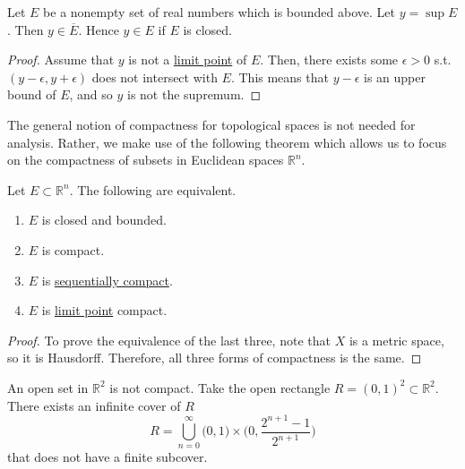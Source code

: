   \begin{theorem}
    \label{thm:the-supremum-is-a-closure-point}
    Let $E$ be a nonempty set of real numbers which is bounded above. Let $y = \sup{E}$. Then $y \in \overline{E}$. Hence $y \in E$ if $E$ is closed. 
  \end{theorem}
  \begin{proof}
    Assume that $y$ is not a \hyperref[pst-def:limit-point]{limit point} of $E$. Then, there exists some $\epsilon > 0$ s.t. $(y - \epsilon, y + \epsilon)$ does not intersect with $E$. This means that $y - \epsilon$ is an upper bound of $E$, and so $y$ is not the supremum. 
  \end{proof}

  The general notion of compactness for topological spaces is not needed for analysis. Rather, we make use of the following theorem which allows us to focus on the compactness of subsets in Euclidean spaces $\mathbb{R}^n$. 

  \begin{theorem}
    \label{thm:heine-borel}
    Let $E \subset \mathbb{R}^n$. The following are equivalent. 
    \begin{enumerate}
      \item $E$ is closed and bounded. 
      \item $E$ is compact. 
      \item $E$ is \hyperref[pst-def:sequentially-compact]{sequentially compact}. 
      \item $E$ is \hyperref[pst-def:limit-point]{limit point} compact. 
    \end{enumerate}
  \end{theorem}
  \begin{proof}
    To prove the equivalence of the last three, note that $X$ is a metric space, so it is Hausdorff. Therefore, all three forms of compactness is the same. 
  \end{proof}

  \begin{example}
    \label{ex:open-sets-in-real-plane-are-not-compact}
    An open set in $\mathbb{R}^2$ is not compact. Take the open rectangle $ R = (0,1)^2 \subset \mathbb{R}^2$. There exists an infinite cover of $R$
    \begin{equation}
      R = \bigcup_{n=0}^\infty \big(0,1\big) \times \bigg( 0, \frac{ 2^{n+1} - 1}{2^{n+1}} \bigg)
    \end{equation}
    that does not have a finite subcover. 
  \end{example}

